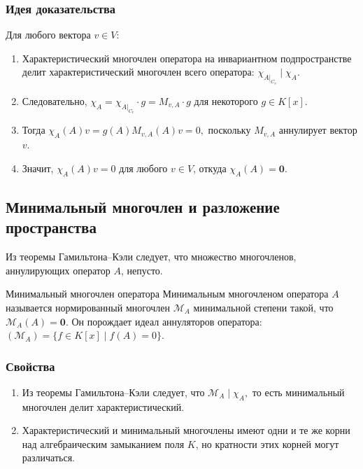 \subsubsection*{Идея доказательства}

Для любого вектора $v \in V$:
\begin{enumerate}
	\item Характеристический многочлен оператора на инвариантном подпространстве делит характеристический многочлен всего оператора: $\chi_{A|_{C_v}} \mid \chi_A.$
	
	\item Следовательно, $\chi_A = \chi_{A|_{C_v}} \cdot g = M_{v,A}\cdot g$
	для некоторого $g \in K[x]$.
	
	\item Тогда $\chi_A(A)v = g(A)M_{v,A}(A)v = 0,$
	поскольку $M_{v,A}$ аннулирует вектор $v$.
	
	\item Значит, $\chi_A(A)v = 0$ для любого $v \in V$, откуда $\chi_A(A) = \mathbf{0}.$
\end{enumerate}

\subsection{Минимальный многочлен и разложение пространства}

Из теоремы Гамильтона--Кэли следует, что множество многочленов, аннулирующих оператор $A$, непусто.

\begin{Definition}{Минимальный многочлен оператора}{}
	Минимальным многочленом оператора $A$ называется нормированный многочлен $\mathcal{M}_A$ минимальной степени такой, что $\mathcal{M}_A(A) = \mathbf{0}.$
	Он порождает идеал аннуляторов оператора: $(\mathcal{M}_A) = \{ f \in K[x] \mid f(A) = 0 \}.$
\end{Definition}

\subsubsection*{Свойства}

\begin{enumerate}
	\item Из теоремы Гамильтона--Кэли следует, что $\mathcal{M}_A \mid \chi_A,$
	то есть минимальный многочлен делит характеристический.
	
	\item Характеристический и минимальный многочлены имеют одни и те же корни над алгебраическим замыканием поля $K$, но кратности этих корней могут различаться.
\end{enumerate}

